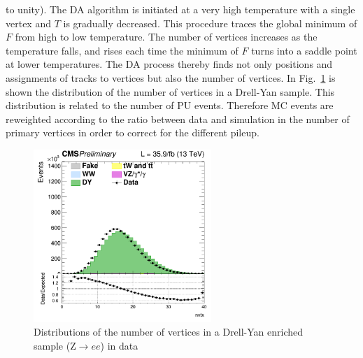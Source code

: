 to unity).
The DA algorithm is initiated at a very high temperature with a single vertex and $T$ is gradually decreased.
This procedure traces the global minimum of $F$ from high to low temperature.
The number of vertices increases as the temperature falls, and rises each time the minimum of $F$ turns into a saddle point at lower temperatures. 
The DA process thereby finds not only positions and assignments of tracks to vertices but also the number of vertices.
In Fig.~\ref{Fig:pu} is shown the distribution of the number of vertices in a Drell-Yan sample. This distribution is related to the number of PU events. Therefore MC events are reweighted according to the ratio between data and simulation in the number of primary vertices in order to correct for the different pileup. 
\begin{figure}[htbp]
\centering
\includegraphics[width=0.6\textwidth]{../AN/Figs/nvertices.png}
\caption{
    Distributions of the number of vertices in a Drell-Yan enriched sample
    (Z$\rightarrow{}ee$) in
    data}
    \label{Fig:pu}
\end{figure}




